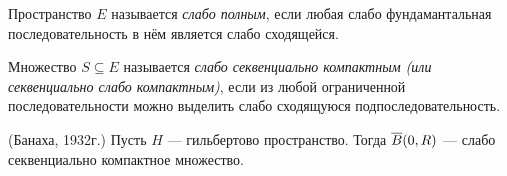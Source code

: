 \begin{definition}
	Пространство $E$ называется \textit{слабо полным}, если любая слабо фундамантальная последовательность в нём является слабо сходящейся.
\end{definition}

\begin{definition}
	Множество $S \subseteq E$ называется \textit{слабо секвенциально компактным (или секвенциально слабо компактным)}, если из любой ограниченной последовательности можно выделить слабо сходящуюся подпоследовательность.
\end{definition}

\begin{theorem} (Банаха, 1932г.)
	Пусть $H$ --- гильбертово пространство. Тогда $\overline{B}(0, R)$ --- слабо секвенциально компактное множество.
\end{theorem}

